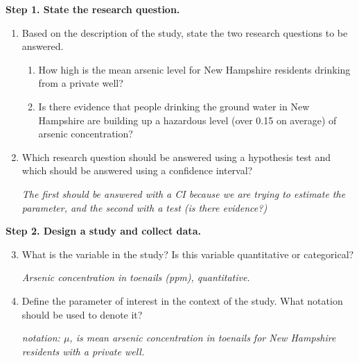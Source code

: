 {\bf Step 1. State the research question. }
\begin{enumerate}
\item  \label{researchQs}Based on the description of the study, state the two research
  questions to be answered.
\begin{students}
  \vspace{2cm}
\end{students}

\begin{key}
  {\it 
    \begin{enumerate}
    \item How high is the mean arsenic level for New Hampshire residents
 drinking from a private well?
    \item Is there evidence that people drinking the ground water in New
 Hampshire are building up a hazardous  level (over 0.15 on average)
 of arsenic concentration? 

    \end{enumerate}
}
\end{key}
  

\item  Which research question should be answered using a hypothesis
  test and which should be answered using a confidence interval? 
\begin{students}
  \vspace{1cm}
\end{students}

\begin{key}
  {\it The first should be answered with a CI because we are trying to
    estimate the parameter,  and the second with a test (is there evidence?)}
\end{key}
\end{enumerate}

{\bf Step 2. Design a study and collect data. }
  \begin{enumerate}
  \setcounter{enumi}{2}
   \item  What is the variable in the study?  Is this variable quantitative
     or categorical?
\begin{students}
  \vspace{1cm}
\end{students}

\begin{key}
  {\it Arsenic concentration in toenails (ppm), quantitative.}
\end{key}

\item 
Define the parameter of interest in the context of the study.  What
notation should be used to denote it?
\begin{students}
  \vspace*{1cm}
\end{students}

\begin{key}
  {\it notation: $\mu$, is mean arsenic concentration in toenails for New Hampshire residents with a private well.}
\end{key}
\end{enumerate}

